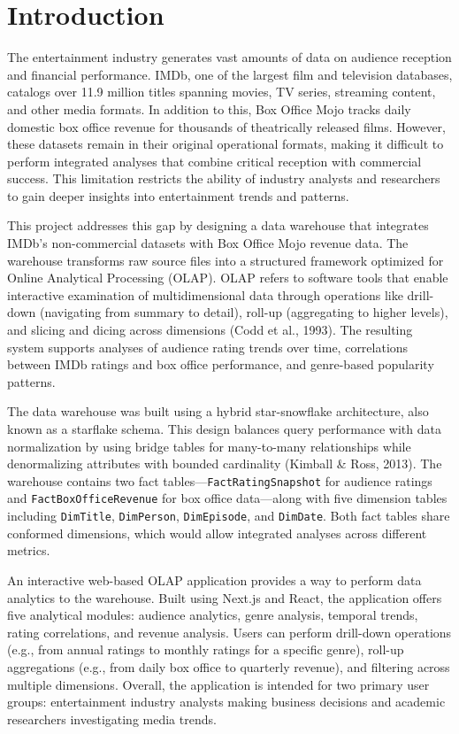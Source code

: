 \section{Introduction}

The entertainment industry generates vast amounts of data on audience reception and financial performance. IMDb, one of the largest film and television databases, catalogs over 11.9 million titles spanning movies, TV series, streaming content, and other media formats. In addition to this, Box Office Mojo tracks daily domestic box office revenue for thousands of theatrically released films. However, these datasets remain in their original operational formats, making it difficult to perform integrated analyses that combine critical reception with commercial success. This limitation restricts the ability of industry analysts and researchers to gain deeper insights into entertainment trends and patterns.

This project addresses this gap by designing a data warehouse that integrates IMDb's non-commercial datasets with Box Office Mojo revenue data. The warehouse transforms raw source files into a structured framework optimized for Online Analytical Processing (OLAP). OLAP refers to software tools that enable interactive examination of multidimensional data through operations like drill-down (navigating from summary to detail), roll-up (aggregating to higher levels), and slicing and dicing across dimensions (Codd et al., 1993). The resulting system supports analyses of audience rating trends over time, correlations between IMDb ratings and box office performance, and genre-based popularity patterns.

The data warehouse was built using a hybrid star-snowflake architecture, also known as a starflake schema. This design balances query performance with data normalization by using bridge tables for many-to-many relationships while denormalizing attributes with bounded cardinality (Kimball \& Ross, 2013). The warehouse contains two fact tables—\texttt{FactRatingSnapshot} for audience ratings and \texttt{FactBoxOfficeRevenue} for box office data—along with five dimension tables including \texttt{DimTitle}, \texttt{DimPerson}, \texttt{DimEpisode}, and \texttt{DimDate}. Both fact tables share conformed dimensions, which would allow integrated analyses across different metrics.

An interactive web-based OLAP application provides a way to perform data analytics to the warehouse. Built using Next.js and React, the application offers five analytical modules: audience analytics, genre analysis, temporal trends, rating correlations, and revenue analysis. Users can perform drill-down operations (e.g., from annual ratings to monthly ratings for a specific genre), roll-up aggregations (e.g., from daily box office to quarterly revenue), and filtering across multiple dimensions. Overall, the application is intended for two primary user groups: entertainment industry analysts making business decisions and academic researchers investigating media trends.
